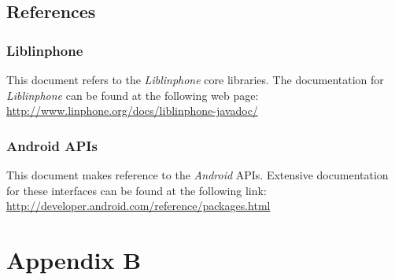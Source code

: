 \documentclass[11pt]{article}
\begin{document}
\subsection{References}
\subsubsection{Liblinphone}
This document refers to the \textit{Liblinphone} core libraries. The documentation for \textit{Liblinphone} can be found at the following web page:\\
\href{http://www.linphone.org/docs/liblinphone-javadoc/}{http://www.linphone.org/docs/liblinphone-javadoc/}
\subsubsection{Android APIs}
This document makes reference to the \textit{Android} APIs. Extensive documentation for these interfaces can be found at the following link:\\
\href{http://developer.android.com/reference/packages.html}{http://developer.android.com/reference/packages.html}

\newpage
\section{Appendix B}
\listoffigures
\end{document}
